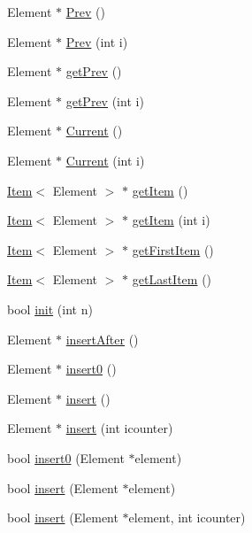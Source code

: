 \begin{CompactItemize}
Element $\ast$ \hyperlink{classCollection_696a19ba00545ca8092e57ac7dd7cb93}{Prev} ()
\item 
Element $\ast$ \hyperlink{classCollection_34e5aa5d88188ee145a34afd5da685cd}{Prev} (int i)
\item 
Element $\ast$ \hyperlink{classCollection_fd1ab2a6e64a0c928422bfac3e86070c}{getPrev} ()
\item 
Element $\ast$ \hyperlink{classCollection_89c9afd1417e3cef4f4ff4cc872d3d76}{getPrev} (int i)
\item 
Element $\ast$ \hyperlink{classCollection_1fc1b94ca31de8d5e45de65dac9d911f}{Current} ()
\item 
Element $\ast$ \hyperlink{classCollection_c6e395083a0e027102bc3ed3d22c9aa5}{Current} (int i)
\item 
\hyperlink{structItem}{Item}$<$ Element $>$ $\ast$ \hyperlink{classCollection_4b50da91af510addb076f61de9bbe34c}{getItem} ()
\item 
\hyperlink{structItem}{Item}$<$ Element $>$ $\ast$ \hyperlink{classCollection_7b9cb5b38e5c0cffba982b61e4f86376}{getItem} (int i)
\item 
\hyperlink{structItem}{Item}$<$ Element $>$ $\ast$ \hyperlink{classCollection_e98ed52c991335611a6b1ef313ca4f10}{getFirstItem} ()
\item 
\hyperlink{structItem}{Item}$<$ Element $>$ $\ast$ \hyperlink{classCollection_a00b700b2845ae6cb655fbc4168c291e}{getLastItem} ()
\item 
bool \hyperlink{classCollection_8196ceec2c64fa65f139fac1f9c30b85}{init} (int n)
\item 
Element $\ast$ \hyperlink{classCollection_f0ec60d9037837a41b1090e1ce752bf8}{insertAfter} ()
\item 
Element $\ast$ \hyperlink{classCollection_18f2aa5b3aa20fbbb5954fc5cf8db21f}{insert0} ()
\item 
Element $\ast$ \hyperlink{classCollection_e6f51634a19b49137358e4f49cad02fb}{insert} ()
\item 
Element $\ast$ \hyperlink{classCollection_dafbeadb36716406356b4824c5eff6e9}{insert} (int icounter)
\item 
bool \hyperlink{classCollection_a1a1cc17e7583a7d6716ec1faa5a2647}{insert0} (Element $\ast$element)
\item 
bool \hyperlink{classCollection_80e96043819f7cc78bf4a8f51aa12b2e}{insert} (Element $\ast$element)
\item 
bool \hyperlink{classCollection_9a79776d894a27aea555a5a50ed5d073}{insert} (Element $\ast$element, int icounter)

\end{CompactItemize}
